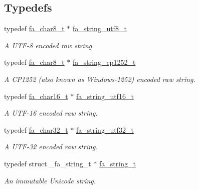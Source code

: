 \subsection*{Typedefs}
\begin{DoxyCompactItemize}
\item 
typedef \hyperlink{group___fa_ga98bfdb5d0438f95f3438cddeab1818e8}{fa\-\_\-char8\-\_\-t} $\ast$ \hyperlink{group___fa_string_ga3f817d24799e6924bc6a5186cd184fd8}{fa\-\_\-string\-\_\-utf8\-\_\-t}
\begin{DoxyCompactList}\small\item\em A U\-T\-F-\/8 encoded raw string. \end{DoxyCompactList}\item 
typedef \hyperlink{group___fa_ga98bfdb5d0438f95f3438cddeab1818e8}{fa\-\_\-char8\-\_\-t} $\ast$ \hyperlink{group___fa_string_ga8da3eea12a368d4c9d82c11c3dc6b9b6}{fa\-\_\-string\-\_\-cp1252\-\_\-t}
\begin{DoxyCompactList}\small\item\em A C\-P1252 (also known as Windows-\/1252) encoded raw string. \end{DoxyCompactList}\item 
typedef \hyperlink{group___fa_ga33e83372a0abc1895fdad5fb4d15eae3}{fa\-\_\-char16\-\_\-t} $\ast$ \hyperlink{group___fa_string_ga8187bab75e77f0bbeeaf7ec2992cf7a9}{fa\-\_\-string\-\_\-utf16\-\_\-t}
\begin{DoxyCompactList}\small\item\em A U\-T\-F-\/16 encoded raw string. \end{DoxyCompactList}\item 
typedef \hyperlink{group___fa_gaca70e02afbba75b08b2b6531b821f67b}{fa\-\_\-char32\-\_\-t} $\ast$ \hyperlink{group___fa_string_ga3e5927ccdebcd9dee40aa6af077662ae}{fa\-\_\-string\-\_\-utf32\-\_\-t}
\begin{DoxyCompactList}\small\item\em A U\-T\-F-\/32 encoded raw string. \end{DoxyCompactList}\item 
typedef struct \-\_\-fa\-\_\-string\-\_\-t $\ast$ \hyperlink{group___fa_string_gacada63033b77bc6c39fa632ae199349b}{fa\-\_\-string\-\_\-t}
\begin{DoxyCompactList}\small\item\em An immutable Unicode string. \end{DoxyCompactList}\end{DoxyCompactItemize}
